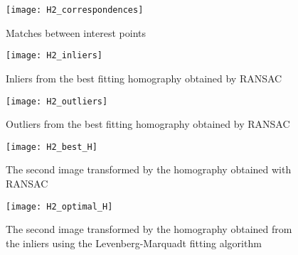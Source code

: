 \begin{figure}[H]
  \centering
  \texttt{[image: H2\_correspondences]}
  \caption{Matches between interest points}
\end{figure}

\begin{figure}[H]
  \centering
  \texttt{[image: H2\_inliers]}
  \caption{Inliers from the best fitting homography obtained by RANSAC}
\end{figure}

\begin{figure}[H]
  \centering
  \texttt{[image: H2\_outliers]}
  \caption{Outliers from the best fitting homography obtained by RANSAC}
\end{figure}

\begin{figure}[H]
  \centering
  \texttt{[image: H2\_best\_H]}
  \caption{The second image transformed by the homography obtained with RANSAC}
\end{figure}

\begin{figure}[H]
  \centering
  \texttt{[image: H2\_optimal\_H]}
  \caption{The second image transformed by the homography obtained from the
  inliers using the Levenberg-Marquadt fitting algorithm}
\end{figure}
